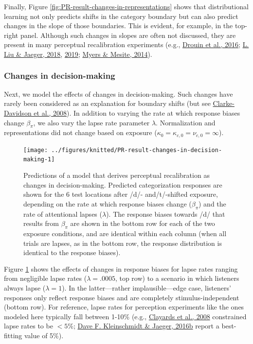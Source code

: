 \documentclass[
  11pt,
  english,
  man,floatsintext]{apa6}
\begin{document}
Finally, Figure \ref{fig:PR-result-changes-in-representations} shows that distributional learning not only predicts shifts in the category boundary but can also predict changes in the slope of those boundaries. This is evident, for example, in the top-right panel. Although such changes in slopes are often not discussed, they are present in many perceptual recalibration experiments (e.g., \protect\hyperlink{ref-drouin2016}{Drouin et al., 2016}; \protect\hyperlink{ref-liu-jaeger2018}{L. Liu \& Jaeger, 2018}, \protect\hyperlink{ref-liu-jaeger2019}{2019}; \protect\hyperlink{ref-myers-mesite2014}{Myers \& Mesite, 2014}).

\hypertarget{changes-in-decision-making}{%
\subsubsection{Changes in decision-making}\label{changes-in-decision-making}}

Next, we model the effects of changes in decision-making. Such changes have rarely been considered as an explanation for boundary shifts (but see \protect\hyperlink{ref-clarkedavidson2008}{Clarke-Davidson et al., 2008}). In addition to varying the rate at which response biases change \(\beta_{\pi}\), we also vary the lapse rate parameter \(\lambda\). Normalization and representations did not change based on exposure (\(\kappa_0 = \kappa_{c,0} = \nu_{c,0} = \infty\)).



\begin{figure}

{\centering \texttt{[image: ../figures/knitted/PR-result-changes-in-decision-making-1]} 

}

\caption{Predictions of a model that derives perceptual recalibration as changes in decision-making. Predicted categorization responses are shown for the 6 test locations after /d/- and/t/-shifted exposure, depending on the rate at which response biases change (\(\beta_{\pi}\)) and the rate of attentional lapses (\(\lambda\)). The response biases towards /d/ that results from \(\beta_{\pi}\) are shown in the bottom row for each of the two exposure conditions, and are identical within each column (when all trials are lapses, as in the bottom row, the response distribution is identical to the response biases).}\label{fig:PR-result-changes-in-decision-making}
\end{figure}

Figure \ref{fig:PR-result-changes-in-decision-making} shows the effects of changes in response biases for lapse rates ranging from negligible lapse rates (\(\lambda = .0005\), top row) to a scenario in which listeners always lapse (\(\lambda = 1\)). In the latter---rather implausible---edge case, listeners' responses only reflect response biases and are completely stimulus-independent (bottom row). For reference, lapse rates for perception experiments like the ones modeled here typically fall between 1-10\% (e.g., \protect\hyperlink{ref-clayards2008}{Clayards et al., 2008} constrained lapse rates to be \(<5\)\%; \protect\hyperlink{ref-kleinschmidt-jaeger2016cogsci}{Dave F. Kleinschmidt \& Jaeger, 2016b} report a best-fitting value of 5\%).
\end{document}
